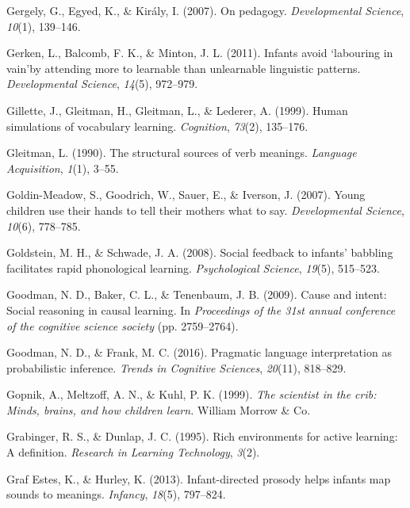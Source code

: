 \documentclass[oneside]{report}
\begin{document}
\leavevmode\hypertarget{ref-gergely2007pedagogy}{}%
Gergely, G., Egyed, K., \& Király, I. (2007). On pedagogy.
\emph{Developmental Science}, \emph{10}(1), 139--146.

\leavevmode\hypertarget{ref-gerken2011infants}{}%
Gerken, L., Balcomb, F. K., \& Minton, J. L. (2011). Infants avoid
`labouring in vain'by attending more to learnable than unlearnable
linguistic patterns. \emph{Developmental Science}, \emph{14}(5),
972--979.

\leavevmode\hypertarget{ref-gillette1999human}{}%
Gillette, J., Gleitman, H., Gleitman, L., \& Lederer, A. (1999). Human
simulations of vocabulary learning. \emph{Cognition}, \emph{73}(2),
135--176.

\leavevmode\hypertarget{ref-gleitman1990structural}{}%
Gleitman, L. (1990). The structural sources of verb meanings.
\emph{Language Acquisition}, \emph{1}(1), 3--55.

\leavevmode\hypertarget{ref-goldin2007young}{}%
Goldin-Meadow, S., Goodrich, W., Sauer, E., \& Iverson, J. (2007). Young
children use their hands to tell their mothers what to say.
\emph{Developmental Science}, \emph{10}(6), 778--785.

\leavevmode\hypertarget{ref-goldstein2008social}{}%
Goldstein, M. H., \& Schwade, J. A. (2008). Social feedback to infants'
babbling facilitates rapid phonological learning. \emph{Psychological
Science}, \emph{19}(5), 515--523.

\leavevmode\hypertarget{ref-goodman2009cause}{}%
Goodman, N. D., Baker, C. L., \& Tenenbaum, J. B. (2009). Cause and
intent: Social reasoning in causal learning. In \emph{Proceedings of the
31st annual conference of the cognitive science society} (pp.
2759--2764).

\leavevmode\hypertarget{ref-goodman2016pragmatic}{}%
Goodman, N. D., \& Frank, M. C. (2016). Pragmatic language
interpretation as probabilistic inference. \emph{Trends in Cognitive
Sciences}, \emph{20}(11), 818--829.

\leavevmode\hypertarget{ref-gopnik1999scientist}{}%
Gopnik, A., Meltzoff, A. N., \& Kuhl, P. K. (1999). \emph{The scientist
in the crib: Minds, brains, and how children learn.} William Morrow \&
Co.

\leavevmode\hypertarget{ref-grabinger1995rich}{}%
Grabinger, R. S., \& Dunlap, J. C. (1995). Rich environments for active
learning: A definition. \emph{Research in Learning Technology},
\emph{3}(2).

\leavevmode\hypertarget{ref-graf2013infant}{}%
Graf Estes, K., \& Hurley, K. (2013). Infant-directed prosody helps
infants map sounds to meanings. \emph{Infancy}, \emph{18}(5), 797--824.
\end{document}
